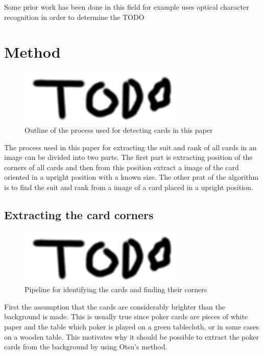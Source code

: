 \documentclass[journal,twoside]{IEEEtran}
\begin{document}
Some prior work has been done in this field for example \cite{PokerVision} uses optical character recognition in order to determine the 
TODO


\section{Method}

\begin{figure}[placement h]
\centering
\includegraphics[scale=0.4, trim= 0cm 0cm 0cm 0cm]{TODO.png}
\caption{Outline of the process used for detecting cards in this paper}
\label{fig:AlgOutline}
\end{figure}

The process used in this paper for extracting the suit and rank of all cards in an image can be divided into two parts. The first part is extracting position of the corners of all cards and then from this position extract a image of the card oriented in a upright position with a known size. The other prat of the algorithm is to find the suit and rank from a image of a card placed in a upright position.

\subsection{Extracting the card corners}

\begin{figure}[placement h]
\centering
\includegraphics[scale=0.4, trim= 0cm 0cm 0cm 0cm]{TODO.png}
\caption{Pipeline for identifying the cards and finding their corners}
\label{fig:CornerOutline}
\end{figure}

First the assumption that the cards are considerably brighter than the background is made. This is usually true since poker cards are pieces of white paper and the table which poker is played on a green tablecloth, or in some cases on a wooden table.
This motivates why it should be possible to extract the poker cards from the background by using Otsu's method\cite{OTSU}.
\end{document}
